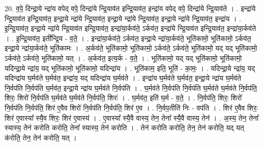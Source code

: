 \documentclass[17pt]{extarticle}
\begin{document}
20. व॒पे॒ दिन्द्रा॒ये न्द्रा॑य वपेद् वपे॒ दिन्द्रा॑ये न्द्रि॒याव॑त इन्द्रि॒याव॑त॒ इन्द्रा॑य वपेद् वपे॒ दिन्द्रा॑ये न्द्रि॒याव॑ते । . इन्द्रा॑ये न्द्रि॒याव॑त इन्द्रि॒याव॑त॒ इन्द्रा॒ये न्द्रा॑ये न्द्रि॒याव॑त॒ इन्द्रा॒ये न्द्रा॑ये न्द्रि॒याव॑त॒ इन्द्रा॒ये न्द्रा॑ये न्द्रि॒याव॑त॒ इन्द्रा॑य । . इ॒न्द्रि॒याव॑त॒ इन्द्रा॒ये न्द्रा॑ये न्द्रि॒याव॑त इन्द्रि॒याव॑त॒ इन्द्रा॑या॒र्कव॑ते॒ ऽर्कव॑त॒ इन्द्रा॑ये न्द्रि॒याव॑त इन्द्रि॒याव॑त॒ इन्द्रा॑या॒र्कव॑ते । . इ॒न्द्रि॒याव॑त॒ इती᳚न्द्रि॒य - व॒ते॒ । . इन्द्रा॑या॒र्कव॑ते॒ ऽर्कव॑त॒ इन्द्रा॒ये न्द्रा॑या॒र्कव॑ते॒ भूति॑कामो॒ भूति॑कामो॒ ऽर्कव॑त॒ इन्द्रा॒ये न्द्रा॑या॒र्कव॑ते॒ भूति॑कामः । . अ॒र्कव॑ते॒ भूति॑कामो॒ भूति॑कामो॒ ऽर्कव॑ते॒ ऽर्कव॑ते॒ भूति॑कामो॒ यद् यद् भूति॑कामो॒ ऽर्कव॑ते॒ ऽर्कव॑ते॒ भूति॑कामो॒ यत् । . अ॒र्कव॑त॒ इत्य॒र्क - व॒ते॒ । . भूति॑कामो॒ यद् यद् भूति॑कामो॒ भूति॑कामो॒ यदिन्द्रा॒ये न्द्रा॑य॒ यद् भूति॑कामो॒ भूति॑कामो॒ यदिन्द्रा॑य । . भूति॑काम॒ इति॒ भूति॑ - का॒मः॒ । . यदिन्द्रा॒ये न्द्रा॑य॒ यद् यदिन्द्रा॑य घ॒र्मव॑ते घ॒र्मव॑त॒ इन्द्रा॑य॒ यद् यदिन्द्रा॑य घ॒र्मव॑ते । . इन्द्रा॑य घ॒र्मव॑ते घ॒र्मव॑त॒ इन्द्रा॒ये न्द्रा॑य घ॒र्मव॑ते नि॒र्वप॑ति नि॒र्वप॑ति घ॒र्मव॑त॒ इन्द्रा॒ये न्द्रा॑य घ॒र्मव॑ते नि॒र्वप॑ति । . घ॒र्मव॑ते नि॒र्वप॑ति नि॒र्वप॑ति घ॒र्मव॑ते घ॒र्मव॑ते नि॒र्वप॑ति॒ शिरः॒ शिरो॑ नि॒र्वप॑ति घ॒र्मव॑ते घ॒र्मव॑ते नि॒र्वप॑ति॒ शिरः॑ । . घ॒र्मव॑त॒ इति॑ घ॒र्म - व॒ते॒ । . नि॒र्वप॑ति॒ शिरः॒ शिरो॑ नि॒र्वप॑ति नि॒र्वप॑ति॒ शिर॑ ए॒वैव शिरो॑ नि॒र्वप॑ति नि॒र्वप॑ति॒ शिर॑ ए॒व । . नि॒र्वप॒तीति॑ निः - वप॑ति । . शिर॑ ए॒वैव शिरः॒ शिर॑ ए॒वास्या᳚ स्यै॒व शिरः॒ शिर॑ ए॒वास्य॑ । . ए॒वास्या᳚ स्यै॒वै वास्य॒ तेन॒ तेना᳚ स्यै॒वै वास्य॒ तेन॑ । . अ॒स्य॒ तेन॒ तेना᳚ स्यास्य॒ तेन॑ करोति करोति॒ तेना᳚ स्यास्य॒ तेन॑ करोति । . तेन॑ करोति करोति॒ तेन॒ तेन॑ करोति॒ यद् यत् क॑रोति॒ तेन॒ तेन॑ करोति॒ यत् । \newline
\end{document}

